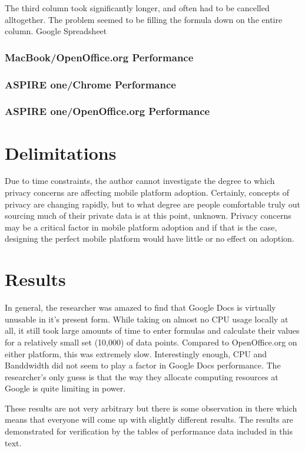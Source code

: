\documentclass[12pt,oneside,letterpaper,titlepage]{article}
\begin{document}
The third column took significantly longer, and often had to be cancelled
alltogether.  The problem seemed to be filling the formula down on the entire
column.  Google Spreadsheet 



\subsubsection{MacBook/OpenOffice.org Performance}

\subsubsection{ASPIRE one/Chrome Performance}

\subsubsection{ASPIRE one/OpenOffice.org Performance}  

\section{Delimitations}


Due to time constraints, the author cannot investigate the degree to which
privacy concerns are affecting mobile platform adoption.  Certainly, concepts of
privacy are changing rapidly, but to what degree are people comfortable truly
out sourcing much of their private data is at this point, unknown.  Privacy
concerns may be a critical factor in mobile platform adoption and if that is the
case, designing the perfect mobile platform would have little or no effect on
adoption.

\section{Results}

In general, the researcher was amazed to find that Google Docs is virtually
unusable in it's present form.  While taking on almost no CPU usage locally at
all, it still took large amounts of time to enter formulas and calculate their
values for a relatively small set (10,000) of data points.  Compared to
OpenOffice.org on either platform, this was extremely slow.  Interestingly
enough, CPU and Banddwidth did not seem to play a factor in Google Docs
performance.  The researcher's only guess is that the way they allocate
computing resources at Google is quite limiting in power.

These results are not very arbitrary but there is some observation in there
which means that everyone will come up with slightly different results.  The
results are demonstrated for verification by the tables of performance data
included in this text.
\end{document}
